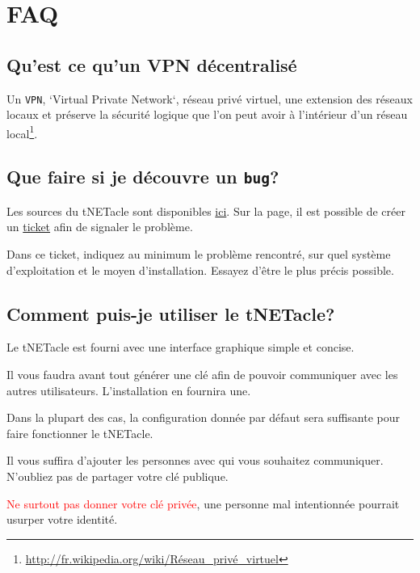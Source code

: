﻿\section{FAQ}
\subsection{Qu'est ce qu'un VPN décentralisé}
Un \texttt{VPN}, `Virtual Private Network`, réseau privé virtuel,
une extension des réseaux locaux et préserve la sécurité logique que
l'on peut avoir à l'intérieur d'un réseau local\footnote{\url{http://fr.wikipedia.org/wiki/Réseau\_privé\_virtuel}}.

\subsection{Que faire si je découvre un \texttt{bug}?}

Les sources du tNETacle sont disponibles \href{https://github.com/LaKabane/tNETacle}{ici}.
Sur la page, il est possible de créer un \href{https://github.com/LaKabane/tNETacle/issues/new}{ticket}
afin de signaler le problème.

Dans ce ticket, indiquez au minimum le problème rencontré, sur quel système d'exploitation et le moyen d'installation.
Essayez d'être le plus précis possible.

\subsection{Comment puis-je utiliser le tNETacle?}
Le tNETacle est fourni avec une interface graphique simple et concise.

Il vous faudra avant tout générer une clé afin de pouvoir communiquer avec les autres utilisateurs.
L'installation en fournira une. 

Dans la plupart des cas, la configuration donnée par défaut sera suffisante pour faire fonctionner le tNETacle.

Il vous suffira d'ajouter les personnes avec qui vous souhaitez communiquer. N'oubliez pas de partager votre clé publique.

\textcolor{red}{Ne surtout pas donner votre clé privée}, une personne mal intentionnée pourrait usurper votre identité.
